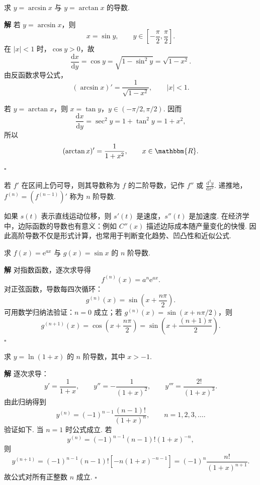 \documentclass[fontset=fandol]{ctexart}
\newenvironment{solution}{\par\noindent\textbf{解}\quad}{\hfill$\square$\par\vspace{0.8em}}
\newcommand{\dd}{\mathrm{d}}
\newcommand{\ee}{\mathrm{e}}
\newcommand{\RR}{\mathbbm{R}}
\begin{document}
\begin{example}[反三角函数导数]
求 $y=\arcsin x$ 与 $y=\arctan x$ 的导数.
\end{example}
\begin{solution}
若 $y=\arcsin x$，则
\[
x=\sin y,\qquad y\in\left[-\frac{\pi}{2},\frac{\pi}{2}\right].
\]
在 $|x|<1$ 时，$\cos y>0$，故
\[
\frac{\dd x}{\dd y}=\cos y=\sqrt{1-\sin^2y}=\sqrt{1-x^2}.
\]
由反函数求导公式，
\[
(\arcsin x)'=\frac{1}{\sqrt{1-x^2}},\qquad |x|<1.
\]

若 $y=\arctan x$，则 $x=\tan y$，$y\in(-\pi/2,\pi/2)$. 因而
\[
\frac{\dd x}{\dd y}=\sec^2y=1+\tan^2y=1+x^2,
\]
所以
\[
(\arctan x)'=\frac1{1+x^2},\qquad x\in\RR.
\]
\end{solution}

\begin{definition}[高阶导数]
若 $f'$ 在区间上仍可导，则其导数称为 $f$ 的二阶导数，记作 $f''$ 或 $\frac{\dd^2y}{\dd x^2}$. 递推地，$f^{(n)}=(f^{(n-1)})'$ 称为 $n$ 阶导数.
\end{definition}

如果 $s(t)$ 表示直线运动位移，则 $s'(t)$ 是速度，$s''(t)$ 是加速度. 在经济学中，边际函数的导数也有意义：例如 $C''(x)$ 描述边际成本随产量变化的快慢. 因此高阶导数不仅是形式计算，也常用于判断变化趋势、凹凸性和近似公式.

\begin{example}[常用函数高阶导数]
求 $f(x)=\ee^{ax}$ 与 $g(x)=\sin x$ 的 $n$ 阶导数.
\end{example}
\begin{solution}
对指数函数，逐次求导得
\[
f^{(n)}(x)=a^n\ee^{ax}.
\]
对正弦函数，导数每四次循环：
\[
g^{(n)}(x)=\sin\left(x+\frac{n\pi}{2}\right).
\]
可用数学归纳法验证：$n=0$ 成立；若 $g^{(n)}(x)=\sin(x+n\pi/2)$，则
\[
g^{(n+1)}(x)=\cos\left(x+\frac{n\pi}{2}\right)=\sin\left(x+\frac{(n+1)\pi}{2}\right).
\]
\end{solution}

\begin{example}[对数函数的高阶导数]
求 $y=\ln(1+x)$ 的 $n$ 阶导数，其中 $x>-1$.
\end{example}
\begin{solution}
逐次求导：
\[
y'=\frac1{1+x},\qquad
y''=-\frac1{(1+x)^2},\qquad
y'''=\frac{2!}{(1+x)^3}.
\]
由此归纳得到
\[
y^{(n)}=(-1)^{n-1}\frac{(n-1)!}{(1+x)^n},\qquad n=1,2,3,\ldots.
\]
验证如下. 当 $n=1$ 时公式成立. 若
\[
y^{(n)}=(-1)^{n-1}(n-1)!(1+x)^{-n},
\]
则
\[
y^{(n+1)}
=(-1)^{n-1}(n-1)![-n(1+x)^{-n-1}]
=(-1)^n\frac{n!}{(1+x)^{n+1}}.
\]
故公式对所有正整数 $n$ 成立.
\end{solution}
\end{document}
